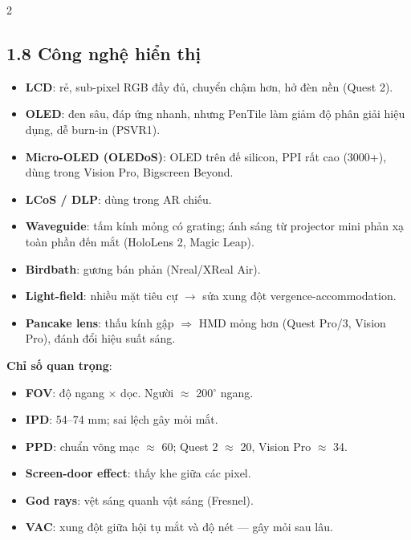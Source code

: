 \begin{paracol}{2}
\switchcolumn

\subsection*{1.8 Công nghệ hiển thị}
\begin{itemize}[leftmargin=*,nosep]
  \item \textbf{LCD}: rẻ, sub-pixel RGB đầy đủ, chuyển chậm hơn, hở đèn nền (Quest 2).
  \item \textbf{OLED}: đen sâu, đáp ứng nhanh, nhưng PenTile làm giảm độ phân giải hiệu dụng, dễ burn-in (PSVR1).
  \item \textbf{Micro-OLED (OLEDoS)}: OLED trên đế silicon, PPI rất cao (3000+), dùng trong Vision Pro, Bigscreen Beyond.
  \item \textbf{LCoS / DLP}: dùng trong AR chiếu.
  \item \textbf{Waveguide}: tấm kính mỏng có grating; ánh sáng từ projector mini phản xạ toàn phần đến mắt (HoloLens 2, Magic Leap).
  \item \textbf{Birdbath}: gương bán phản (Nreal/XReal Air).
  \item \textbf{Light-field}: nhiều mặt tiêu cự $\to$ sửa xung đột vergence-accommodation.
  \item \textbf{Pancake lens}: thấu kính gập $\Rightarrow$ HMD mỏng hơn (Quest Pro/3, Vision Pro), đánh đổi hiệu suất sáng.
\end{itemize}
\textbf{Chỉ số quan trọng}:
\begin{itemize}[leftmargin=*,nosep]
  \item \textbf{FOV}: độ ngang $\times$ dọc. Người $\approx$ 200$^\circ$ ngang.
  \item \textbf{IPD}: 54–74 mm; sai lệch gây mỏi mắt.
  \item \textbf{PPD}: chuẩn võng mạc $\approx$ 60; Quest 2 $\approx$ 20, Vision Pro $\approx$ 34.
  \item \textbf{Screen-door effect}: thấy khe giữa các pixel.
  \item \textbf{God rays}: vệt sáng quanh vật sáng (Fresnel).
  \item \textbf{VAC}: xung đột giữa hội tụ mắt và độ nét — gây mỏi sau lâu.
\end{itemize}

\switchcolumn*


\end{paracol}
